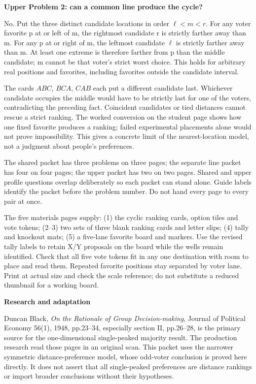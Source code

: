 \documentclass[11pt,letterpaper]{article}
\newcommand{\heading}[1]{\par\vspace{4pt}{\large\bfseries #1}\par}
\newcommand{\sub}[1]{\par\textbf{#1}\par}
\begin{document}
\sub{Upper Problem 2: can a common line produce the cycle?}
No. Put the three distinct candidate locations in order $\ell<m<r$. For any voter favorite p at or left of m, the rightmost candidate r is strictly farther away than m. For any p at or right of m, the leftmost candidate $\ell$ is strictly farther away than m. At least one extreme is therefore farther from p than the middle candidate; m cannot be that voter's strict worst choice. This holds for arbitrary real positions and favorites, including favorites outside the candidate interval.

The cards $ABC$, $BCA$, $CAB$ each put a different candidate last. Whichever candidate occupies the middle would have to be strictly last for one of the voters, contradicting the preceding fact. Coincident candidates or tied distances cannot rescue a strict ranking. The worked conversion on the student page shows how one fixed favorite produces a ranking; failed experimental placements alone would not prove impossibility. This gives a concrete limit of the nearest-location model, not a judgment about people's preferences.
\newpage
\heading{Print map, provenance and use record}
The shared packet has three problems on three pages; the separate line packet has four on four pages; the upper packet has two on two pages. Shared and upper profile questions overlap deliberately so each packet can stand alone. Guide labels identify the packet before the problem number. Do not hand every page to every pair at once.

The five materials pages supply: (1) the cyclic ranking cards, option tiles and vote tokens; (2--3) two sets of three blank ranking cards and letter slips; (4) tally and knockout mats; (5) a five-lane favorite board and markers. Use the revised tally labels to retain X/Y proposals on the board while the wells remain identified. Check that all five vote tokens fit in any one destination with room to place and read them. Repeated favorite positions stay separated by voter lane. Print at actual size and check the scale reference; do not substitute a reduced thumbnail for a working board.

\sub{Research and adaptation}
Duncan Black, \emph{On the Rationale of Group Decision-making}, Journal of Political Economy 56(1), 1948, pp.23--34, especially section II, pp.26--28, is the primary source for the one-dimensional single-peaked majority result. The production research read those pages in an original scan. This packet uses the narrower symmetric distance-preference model, whose odd-voter conclusion is proved here directly. It does not assert that all single-peaked preferences are distance rankings or import broader conclusions without their hypotheses.
\end{document}
